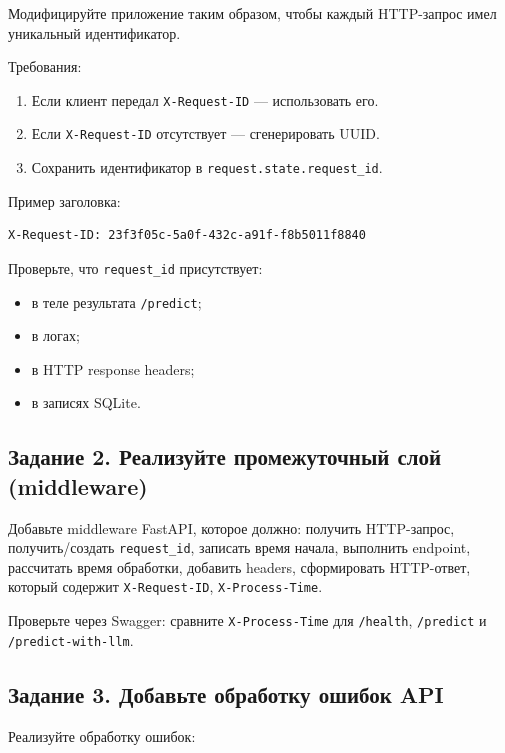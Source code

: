 \documentclass[12pt,a4paper]{article}
\begin{document}
Модифицируйте приложение таким образом, чтобы каждый HTTP-запрос имел уникальный идентификатор.

Требования:

\begin{enumerate}
    \item Если клиент передал \texttt{X-Request-ID} — использовать его.
    \item Если \texttt{X-Request-ID} отсутствует — сгенерировать UUID.
    \item Сохранить идентификатор в \texttt{request.state.request\_id}.
\end{enumerate}

Пример заголовка:

\begin{lstlisting}[caption={Пример заголовка}]
X-Request-ID: 23f3f05c-5a0f-432c-a91f-f8b5011f8840
\end{lstlisting}

Проверьте, что \texttt{request\_id} присутствует:

\begin{itemize}
    \item в теле результата \texttt{/predict};
    \item в логах;
    \item в HTTP response headers;
    \item в записях SQLite.
\end{itemize}

\subsection{Задание 2. Реализуйте промежуточный слой (middleware)}

Добавьте middleware FastAPI, которое должно: получить HTTP-запрос, получить/создать \texttt{request\_id}, записать время начала, выполнить endpoint, рассчитать время обработки, добавить headers, сформировать HTTP-ответ, который содержит \texttt{X-Request-ID}, \texttt{X-Process-Time}.

Проверьте через Swagger: сравните \texttt{X-Process-Time} для \texttt{/health}, \texttt{/predict} и \texttt{/predict-with-llm}.

\subsection{Задание 3. Добавьте обработку ошибок API}

Реализуйте обработку ошибок:
\end{document}
